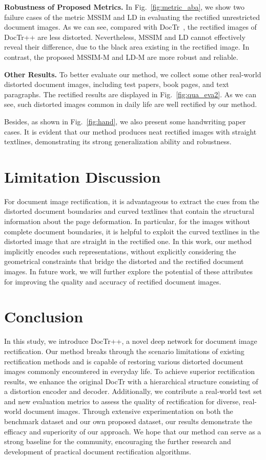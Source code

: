 \documentclass[lettersize,journal]{IEEEtran}
\begin{document}
\smallskip
\textbf{Robustness of Proposed Metrics.}
In Fig.~\ref{fig:metric_aba},
we show two failure cases of the metric MSSIM and LD in evaluating the rectified unrestricted document images.
As we can see, compared with DocTr~\cite{feng2021doctr}, 
the rectified images of DocTr++ are less distorted. 
Nevertheless,
MSSIM and LD cannot effectively reveal their difference,
due to the black area existing in the rectified image.
In contrast, 
the proposed MSSIM-M and LD-M are more robust and reliable.


\smallskip
\textbf{Other Results.}
To better evaluate our method, we collect some other real-world distorted document images, including test papers, book pages, and text paragraphs. The rectified results are displayed in Fig.~\ref{fig:qua_eva2}. As we can see, such distorted images common in daily life are well rectified by our method.

Besides, as shown in Fig.~\ref{fig:hand}, we also present some handwriting paper cases. 
It is evident that our method produces neat rectified images with straight textlines, demonstrating its strong generalization ability and robustness.


\section{Limitation Discussion}
For document image rectification,
it is advantageous to extract the cues from the 
distorted document boundaries and curved textlines that contain the structural information about the page deformation. 
In particular, for the images without complete document boundaries,
it is helpful to exploit the curved textlines in the distorted image that are straight in the rectified one.
In this work, our method implicitly encodes such representations, without explicitly considering the geometrical constraints that bridge the distorted and the rectified document images.
In future work, we will further explore the potential of these attributes for improving the quality and accuracy of rectified document images.

\section{Conclusion}
In this study, we introduce DocTr++, a novel deep network for document image rectification.
Our method breaks through the scenario limitations of existing rectification methods and is capable of restoring various distorted document images commonly encountered in everyday life.
To achieve superior rectification results, we enhance the original DocTr with a hierarchical structure consisting of a distortion encoder and decoder. 
Additionally, we contribute a real-world test set and new evaluation metrics to assess the quality of rectification for diverse, real-world document images. 
Through extensive experimentation on both the benchmark dataset and our own proposed dataset, our results demonstrate the efficacy and superiority of our approach.
We hope that our method can serve as a strong baseline for the community,
encouraging the further research and development of practical document rectification algorithms.



{
	
	
}
\end{document}
